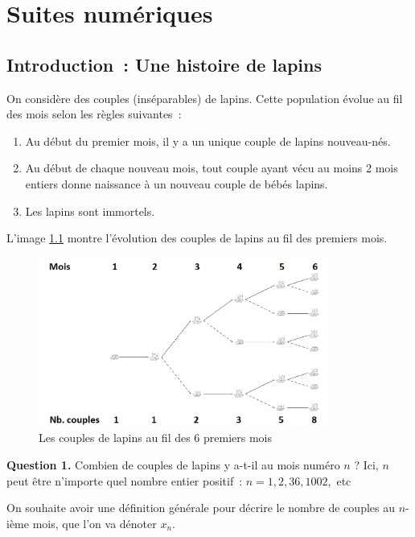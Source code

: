 \chapter{Suites numériques}

\label{chap:suite}
\section{Introduction~: Une histoire de lapins}
On considère des couples (inséparables) de lapins. Cette population évolue au fil des mois selon les règles suivantes~:
\begin{enumerate}
    \item Au début du premier mois, il y a un unique couple de lapins nouveau-nés.
    \item Au début de chaque nouveau mois, tout couple ayant vécu au moins 2 mois entiers donne naissance à un nouveau couple de bébés lapins.
    \item Les lapins sont immortels.
\end{enumerate}
L'image \ref{fig:rabbits} montre l'évolution des couples de lapins au fil des premiers mois.
\begin{figure}[H]
\centering \includegraphics[width = 0.85\textwidth]{./assets/imgs/rabbit_tree.jpg}
\caption{Les couples de lapins au fil des 6 premiers mois}
\label{fig:rabbits}
\end{figure}

\begin{greybox}
\textbf{Question 1.} Combien de couples de lapins y a-t-il au mois numéro $n$ ? Ici, $n$ peut être n'importe quel nombre entier positif~: $n = 1, 2, 36, 1002,$ etc\textellipsis

On souhaite avoir une définition générale pour décrire le nombre de couples au $n$-ième mois, que l'on va dénoter $x_n$. 
\end{greybox}

